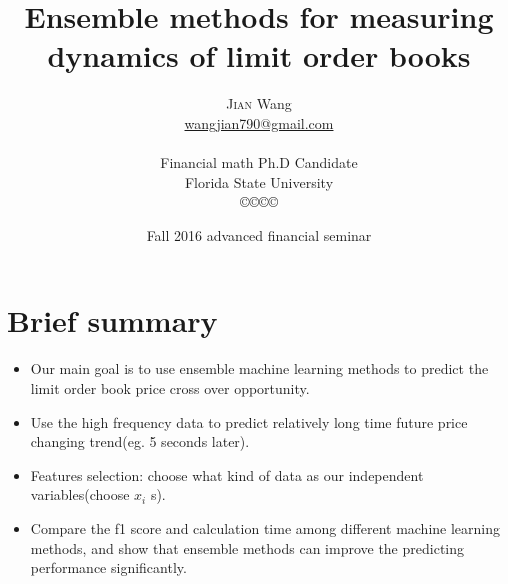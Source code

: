 \documentclass[xcolor={x11names,svgnames,dvipsnames}]{beamer}
\author[\textsc{Jian} Wang]{\textsc{Jian} Wang\\[1ex]%
{\small\url{wangjian790@gmail.com}\\[-.5ex]\url{}}\\
{\small{Financial math Ph.D Candidate}}\\
{\small{Florida State University}}\\
[0.8ex]\copyright\copyright\copyright\copyright} %
\title{Ensemble methods for measuring dynamics of limit order books}
\date[\textsc{Financial seminar} 2016]{Fall 2016 advanced financial seminar\\ }%
\begin{document}
\begin{frame}
\maketitle
\end{frame}



\section{Brief summary}
\begin{frame}
\begin{itemize}
	\item Our main goal is to use ensemble machine learning methods to predict the limit order book price \alert{cross over} opportunity.  	
	\item Use the high frequency data to predict relatively \alert{long time} future price changing trend(eg. 5 seconds later).
     \item Features selection: choose what kind of data as our independent variables(\alert{choose $x_i$ s}).  
   	\item Compare the f1 score and calculation time  among different machine learning methods, and show that ensemble methods can improve the \alert{predicting performance} significantly.  	
\end{itemize}
\end{frame}
\end{document}
